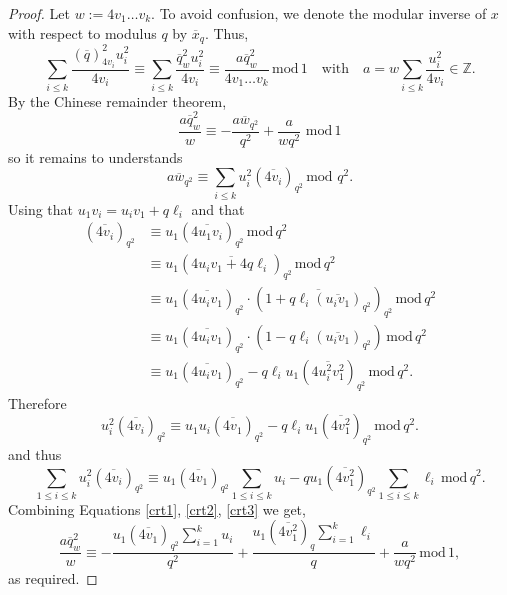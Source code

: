 \documentclass[12pt,reqno]{amsart}
\theoremstyle{plain}
\numberwithin{equation}{section}
\numberwithin{figure}{section}
\theoremstyle{plain}
\theoremstyle{definition}
\theoremstyle{remark}
\newcommand{\mmod}{\,\mathrm{mod}\,}
\begin{document}
\begin{proof}
Let $w := 4 v_1 \ldots v_k$. 
To avoid confusion, we denote the modular inverse of $x$ with respect
to modulus $q$ by $\overline{x}_{q}$.
Thus, 
$$
\sum_{i \leq k} \frac{(\overline{q})_{4 v_i}^2 u_i^2}{4 v_i} 
\equiv \sum_{i \leq k} \frac{\overline{q}_{w}^2 u_i^2}{4 v_i} 
\equiv \frac{a {\overline{q}}_{w}^2}{4 v_1 \ldots v_k} 
\,\mathrm{mod}\,1 \quad \mathrm{with} \quad
a = w \sum_{i \leq k} \frac{u_i^2}{4 v_i} \in \mathbb{Z}.
$$
By the Chinese remainder theorem,
\begin{equation} \label{crt1}
\frac{a \overline{q}_{w}^2}{w} \equiv - 
\frac{a \overline{w}_{q^2}}{q^2} + \frac{a}{w q^2}
\, \,\mathrm{mod}\,1
\end{equation}
so it remains to understands
\begin{equation} \label{crt2}
a \overline{w}_{q^2} \equiv \sum_{i \leq k} u_i^2 (\overline{4 v_i})_{q^2}
\,\mathrm{mod}\,\,q^2.
\end{equation}
Using that $u_1 v_i = u_i v_1 + q \ell_i$ and that
\begin{align*}
  (\overline{4 v_i})_{q^2} & \equiv u_1 (\overline{4 u_1 v_i})_{q^2} \mmod{q^2}
  \\ & \equiv u_1 (\overline{4 u_i v_1 + 4 q \ell_i})_{q^2} \mmod{q^2}
  \\ & \equiv u_1 (\overline{4 u_i v_1})_{q^2} \cdot (\overline{1 + q \ell_i (\overline{u_i v_1})_{q^2}})_{q^2} \mmod{q^2}
  \\ & \equiv u_1 (\overline{4 u_i v_1})_{q^2} \cdot (1 - q \ell_i (\overline{u_i v_1})_{q^2})  \mmod{q^2}
  \\ & \equiv u_1 (\overline{4 u_i v_1})_{q^2} - q \ell_i u_1 (\overline{4 u_i^2 v_1^2})_{q^2} \mmod{q^2}. 
\end{align*}
Therefore
$$
u_i^2 (\overline{4 v_i})_{q^2} \equiv u_1 u_i (\overline{4 v_1})_{q^2} - q \ell_i u_1 (\overline{4 v_1^2})_{q^2} \mmod{q^2}. 
$$
and thus
\begin{equation} \label{crt3}
\sum_{1 \leq i \leq k} u_i^2 (\overline{4 v_i})_{q^2} \equiv u_1 (\overline{4 v_1})_{q^2} \sum_{1 \leq i \leq k} u_i - q u_1 (\overline{4 v_1^2})_{q^2} \sum_{1 \leq i \leq k} \ell_i \mmod{q^2}. 
\end{equation}
Combining Equations \eqref{crt1}, \eqref{crt2}, \eqref{crt3} we get,
$$
\frac{a \overline{q}_{w}^2}{w} \equiv - \frac{u_1 (\overline{4 v_1})_{q^2} \sum_{i = 1}^{k} u_i}{q^2} + \frac{u_1 (\overline{4 v_1^2})_{q} \sum_{i = 1}^{k} \ell_i}{q} + \frac{a}{w q^2} \mmod{1},
$$
as required.
\end{proof}
\end{document}
